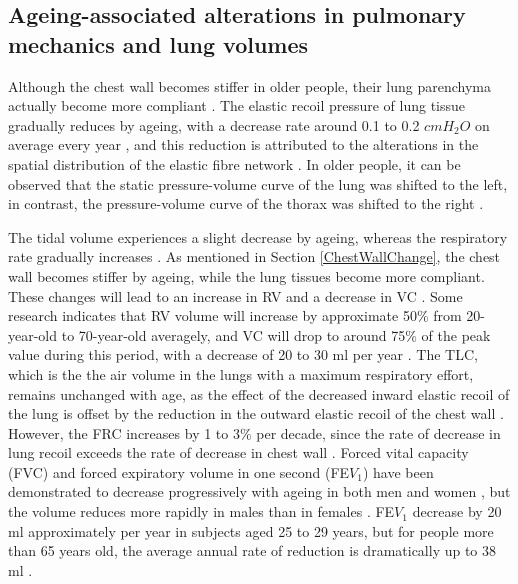 \subsection{Ageing-associated alterations in pulmonary mechanics and lung volumes}
Although the chest wall becomes stiffer in older people, their lung parenchyma actually become more compliant \citep{mittman1965relationship, turner1968elasticity, zaugg2000respiratory}. The elastic recoil pressure of lung tissue gradually reduces by ageing, with a decrease rate around 0.1 to 0.2 $cmH_2O$ on average every year \citep{turner1968elasticity}, and this reduction is attributed to the alterations in the spatial distribution of the elastic fibre network \citep{sprung2006age}. In older people, it can be observed that the static pressure-volume curve of the lung was shifted to the left, in contrast, the pressure-volume curve of the thorax was shifted to the right \citep{zaugg2000respiratory,sprung2006age}.

The tidal volume experiences a slight decrease by ageing, whereas the respiratory rate gradually increases \citep{sprung2006age}. As mentioned in Section \ref{ChestWallChange}, the chest wall becomes stiffer by ageing, while the lung tissues become more compliant. These changes will lead to an increase in RV and a decrease in VC \citep{lalley2013aging}. Some research indicates that RV volume will increase by approximate 50\% from 20-year-old to 70-year-old averagely, and VC will drop to around 75\% of the peak value during this period, with a decrease of 20 to 30 ml per year \citep{janssens1999physiological, sprung2006age}. The TLC, which is the the air volume in the lungs with a maximum respiratory effort, remains unchanged with age, as the effect of the decreased inward elastic recoil of the lung is offset by the reduction in the outward elastic recoil of the chest wall \citep{sprung2006age}. However, the FRC increases by 1 to 3\% per decade, since the rate of decrease in lung recoil exceeds the rate of decrease in chest wall \citep{janssens1999physiological, lalley2013aging}. Forced vital capacity (FVC) and forced expiratory volume in one second (FE$V_1$) have been demonstrated to decrease progressively with ageing in both men and women \citep{knudson1976maximal}, but the volume reduces more rapidly in males than in females \citep{crapo1993aging}. FE$V_1$ decrease by 20 ml approximately per year in subjects aged 25 to 29 years, but for people more than 65 years old, the average annual rate of reduction is dramatically up to 38 ml \citep{brandstetter1983aging}.

